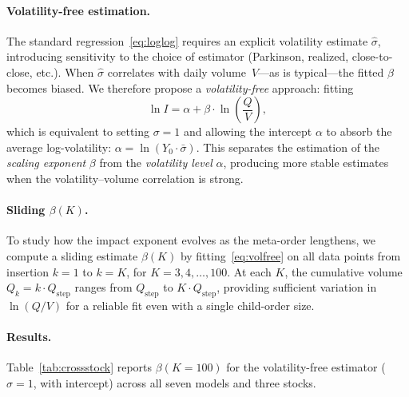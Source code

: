 \documentclass[sigplan,screen,anonymous]{acmart}
\begin{document}
\paragraph{Volatility-free estimation.} The standard regression~\eqref{eq:loglog} requires an explicit volatility estimate $\hat{\sigma}$, introducing sensitivity to the choice of estimator (Parkinson, realized, close-to-close, etc.). When $\hat{\sigma}$ correlates with daily volume~$V$---as is typical---the fitted $\beta$ becomes biased. We therefore propose a \emph{volatility-free} approach: fitting
\begin{equation}
  \ln I = \alpha + \beta \cdot \ln\!\left(\frac{Q}{V}\right),
  \label{eq:volfree}
\end{equation}
which is equivalent to setting $\sigma = 1$ and allowing the intercept $\alpha$ to absorb the average log-volatility: $\alpha = \ln(Y_0 \cdot \bar{\sigma})$. This separates the estimation of the \emph{scaling exponent} $\beta$ from the \emph{volatility level} $\alpha$, producing more stable estimates when the volatility--volume correlation is strong.

\paragraph{Sliding $\beta(K)$.} To study how the impact exponent evolves as the meta-order lengthens, we compute a sliding estimate $\beta(K)$ by fitting~\eqref{eq:volfree} on all data points from insertion $k = 1$ to $k = K$, for $K = 3, 4, \ldots, 100$. At each $K$, the cumulative volume $Q_k = k \cdot Q_{\text{step}}$ ranges from $Q_{\text{step}}$ to $K \cdot Q_{\text{step}}$, providing sufficient variation in $\ln(Q/V)$ for a reliable fit even with a single child-order size.

\paragraph{Results.} Table~\ref{tab:crossstock} reports $\beta(K{=}100)$ for the volatility-free estimator ($\sigma = 1$, with intercept) across all seven models and three stocks.
\end{document}
